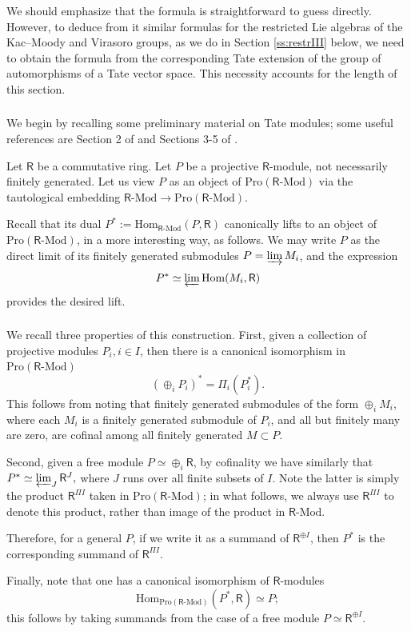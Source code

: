 \documentclass{amsart}
\theoremstyle{definition}
\newcommand{\Pro}{\on{Pro}}
\newcommand{\sss}{\subsubsection{}}
\newcommand{\Hom}{\on{Hom}}
\renewcommand{\mod}{\text{-}\on{Mod}}
\newcommand{\on}{\mathrm}
\newcommand{\Ring}{\mathsf{R}}
\numberwithin{equation}{section}
\begin{document}
\sss We should emphasize that the formula is straightforward to guess directly. However, to deduce from it similar formulas for the restricted Lie algebras of the Kac--Moody and Virasoro groups, as we do in Section \ref{ss:restrIII} below, we need to obtain the formula from the corresponding Tate extension of the group of automorphisms of a Tate vector space. This necessity accounts for the length of this section. 



\sss  We begin by recalling some preliminary material on Tate modules; some useful references are Section 2 of \cite{BBE} and Sections 3-5 of \cite{DrInf}.

 
 Let $\Ring$ be a commutative ring. Let $P$ be a projective $\Ring$-module, not necessarily finitely generated. Let us view $P$ as an object of $\Pro(\Ring\mod)$ via the tautological embedding $\Ring\mod \rightarrow \Pro(\Ring\mod)$.

Recall that its dual $P^* := \Hom_{\Ring\mod}(P, \Ring)$ canonically lifts to an object of $\Pro(\Ring\mod)$, in a more interesting way, as follows. We may write $P$ as the direct limit of its finitely generated submodules $P = \varinjlim M_i$, and the expression $$P^* \simeq \varprojlim \Hom(M_i, \Ring)$$provides the desired lift. 


\sss  We recall three properties of this construction. First, given a collection of projective modules $P_i, i \in I$, then there is a canonical isomorphism in $\Pro(\Ring\mod)$
$$(\oplus_i P_i)^* = \Pi_i (P_i^*).$$    
This follows from noting that finitely generated submodules of the form $\oplus_i M_i$, where each $M_i$ is a finitely generated submodule of $P_i$, and all but finitely many are zero, are cofinal among all finitely generated $M \subset P$.

Second, given a free module $P \simeq \oplus_i \Ring$, by cofinality we have similarly that $P^* \simeq  \varprojlim_J \Ring^{J},$ where $J$ runs over all finite subsets of $I$.  Note the latter is simply the product $\Ring^{\Pi I}$ taken in $\Pro(\Ring\mod)$; in what follows, we always use $\Ring^{\Pi I}$ to denote this product, rather than image of the product in $\Ring\mod$. 

Therefore, for a general $P$, if we write it as a summand of $\Ring^{\oplus I}$, then $P^*$ is the corresponding summand of $\Ring^{\Pi I}$. 


Finally, note that one has a canonical isomorphism of $\Ring$-modules
$$\Hom_{\Pro(\Ring\mod)}(P^*, \Ring) \simeq P;$$
this follows by taking summands from the case of a free module $P \simeq \Ring^{\oplus I}$. 
\end{document}
